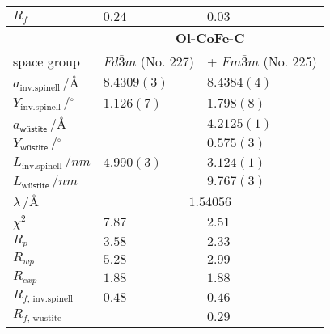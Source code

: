 \documentclass[\main/dresen_thesis.tex]{subfiles}
\begin{document}
\begin{table}[ht]
\begin{tabular}{ l | l | l }
      \rule{0pt}{2ex} $R_{f}$   & $0.24$ & $0.03$ \\
      \hline
      \hline
      \rule{0pt}{2ex} & \multicolumn{2}{c}{\textbf{Ol-CoFe-C}}\\
      \hline
      \hline
      \rule{0pt}{2ex}space group & $Fd\bar{3}m$ (No. 227) & + $Fm\bar{3}m$ (No. 225)\\
      \hline
      \rule{0pt}{2ex} $a_\mathrm{inv. spinell} \,/ \unit{\angstrom}$         & $8.4309(3)$ & $8.4384(4)$  \\
      \rule{0pt}{2ex} $Y_\mathrm{inv. spinell} \,/ \unit{^\circ}$            & $1.126(7)$  & $1.798(8)$   \\
      \rule{0pt}{2ex} $a_\textsf{w\"ustite}     \,/ \unit{\angstrom}$          &             & $4.2125(1)$  \\
      \rule{0pt}{2ex} $Y_\textsf{w\"ustite}     \,/ \unit{^\circ}$             &             & $0.575(3)$   \\
      \hline
      \rule{0pt}{2ex} $L_\mathrm{inv. spinell} \,/ \unit{nm}$                & $4.990(3)$  & $3.124(1)$ \\
      \rule{0pt}{2ex} $L_\textsf{w\"ustite}      \,/ \unit{nm}$                &             & $9.767(3)$ \\
      \hline
      \rule{0pt}{2ex} $\lambda \,/ \unit{\angstrom}$  & \multicolumn{2}{c}{$1.54056$}\\
      \hline
      \rule{0pt}{2ex} $\chi^2$                   & $7.87$ & $2.51$ \\
      \rule{0pt}{2ex} $R_p$                      & $3.58$ & $2.33$ \\
      \rule{0pt}{2ex} $R_{wp}$                   & $5.28$ & $2.99$ \\
      \rule{0pt}{2ex} $R_{exp}$                  & $1.88$ & $1.88$ \\
      \rule{0pt}{2ex} $R_{f, \, \mathrm{inv. spinell}}$   & $0.48$ & $0.46$ \\
      \rule{0pt}{2ex} $R_{f, \, \mathrm{wustite}}$       &        & $0.29$ \\
      \hline
    \end{tabular}
  \end{table}
\end{document}
